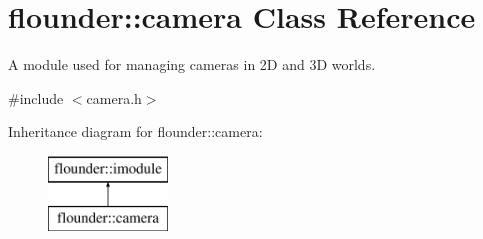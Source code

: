 \hypertarget{classflounder_1_1camera}{}\section{flounder\+:\+:camera Class Reference}
\label{classflounder_1_1camera}


A module used for managing cameras in 2D and 3D worlds.  




{\ttfamily \#include $<$camera.\+h$>$}

Inheritance diagram for flounder\+:\+:camera\+:\begin{figure}[H]
\begin{center}
\leavevmode
\includegraphics[height=2.000000cm]{classflounder_1_1camera}
\end{center}
\end{figure}
